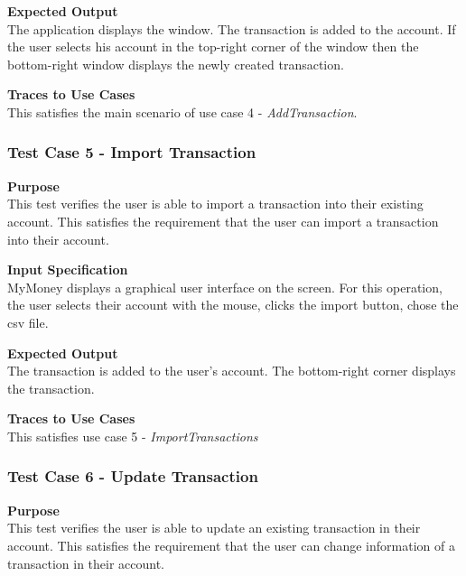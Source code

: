 \documentclass[12pt]{article}
\begin{document}
\noindent
{\bf Expected Output}\\
The application displays the window.    
The transaction is added to the account.
If the user selects his account in the top-right corner of the window then
the bottom-right window displays the newly created transaction.
                                                
\noindent
{\bf Traces to Use Cases}\\
This satisfies the main scenario of use case 4 - \textit{AddTransaction}.

\clearpage %
\subsubsection{Test Case 5 - Import Transaction} \label{TC-5}

\noindent
{\bf Purpose}\\
This test verifies the user is able to import a transaction into their existing account.
This satisfies the requirement that the user can import a transaction into their account.
                                                        

\noindent
{\bf Input Specification}\\
MyMoney displays a graphical user interface on the screen.
For this operation, the user selects their account with the mouse,
clicks the import button, chose the csv file.
                                                          

\noindent
{\bf Expected Output}\\
The transaction is added to the user's account.
The bottom-right corner displays the transaction.


\noindent
{\bf Traces to Use Cases}\\
This satisfies use case 5 - \textit{ImportTransactions}

\subsubsection{Test Case 6 - Update Transaction} \label{TC-6}
\noindent
{\bf Purpose}\\
This test verifies the user is able to update an existing transaction in their account.
This satisfies the requirement that the user can change information of a transaction in their account.
                                                        
\end{document}
